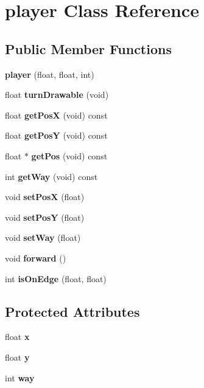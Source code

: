 \section{player Class Reference}
\label{classplayer}
\subsection*{Public Member Functions}
\begin{DoxyCompactItemize}
\item 
\mbox{\label{classplayer_a1bb8a7a0826319d6478fdc8d0646cb44}} 
{\bfseries player} (float, float, int)
\item 
\mbox{\label{classplayer_a0d21f3a93f19e8db64c292041a9df741}} 
float {\bfseries turn\+Drawable} (void)
\item 
\mbox{\label{classplayer_a94780f0cab9b7bc64b96c41a5eda37f5}} 
float {\bfseries get\+PosX} (void) const
\item 
\mbox{\label{classplayer_aa05fc23c830ab8aa9ac0d501cc373437}} 
float {\bfseries get\+PosY} (void) const
\item 
\mbox{\label{classplayer_a7b4e77c30b428491542d4db67f8a730a}} 
float $\ast$ {\bfseries get\+Pos} (void) const
\item 
\mbox{\label{classplayer_a979ab94d5734e9f1403c5ca10b749c86}} 
int {\bfseries get\+Way} (void) const
\item 
\mbox{\label{classplayer_a8022861762da457945c438567a7a292f}} 
void {\bfseries set\+PosX} (float)
\item 
\mbox{\label{classplayer_a5e0d3eec1d24faac4f091f21a6ec767b}} 
void {\bfseries set\+PosY} (float)
\item 
\mbox{\label{classplayer_a42b4e39d4c428aa504e576cb3af7d759}} 
void {\bfseries set\+Way} (float)
\item 
\mbox{\label{classplayer_a85c3a6aeae5fc828c795d4e07d6f09ce}} 
void {\bfseries forward} ()
\item 
\mbox{\label{classplayer_a80aa9976bf0ea61ca1ed0e140a5179d1}} 
int {\bfseries is\+On\+Edge} (float, float)
\end{DoxyCompactItemize}
\subsection*{Protected Attributes}
\begin{DoxyCompactItemize}
\item 
\mbox{\label{classplayer_aa90eebef283ae699474d11673aa55f31}} 
float {\bfseries x}
\item 
\mbox{\label{classplayer_aad2d959f61d8eaf5f75bd38d9fc6784d}} 
float {\bfseries y}
\item 
\mbox{\label{classplayer_afbef4efdba300b6b8aa6d07b31b124d1}} 
int {\bfseries way}
\end{DoxyCompactItemize}


